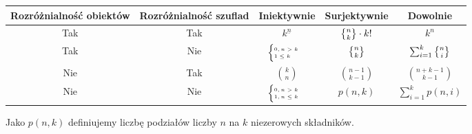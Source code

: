     \begin{table}[h]
    \centering
    \begin{tabular}{@{}cc|ccc@{}}
    \toprule
    Rozróżnialność obiektów & Rozróżnialność szuflad & Iniektywnie & Surjektywnie & Dowolnie \\ \midrule
    Tak                     & Tak                    & $k^{\underline{n}}$           & $\stirling{n}{k} \cdot k!$            & $k^n$        \\
    Tak                     & Nie                    & $\tiny \begin{cases} 0, n>k \\ 1 \leq k\end{cases}$           & $\stirling{n}{k}$            & $\sum_{i=1}^k \stirling{n}{i}$       \\
    Nie                     & Tak                    & $\binom{k}{n} $          & $\binom{n-1}{k-1}$            & $\binom{n+k-1}{k-1}$        \\
    Nie                     & Nie                    & $\tiny\begin{cases}0, n>k \\ 1, n \leq k \end{cases}$           & $p(n,k)$            & $\sum_{i=1}^k p(n,i)$        \\ \bottomrule
    \end{tabular}
    \end{table}

    Jako $p(n,k)$ definiujemy liczbę podziałów liczby $n$ na $k$ niezerowych składników.